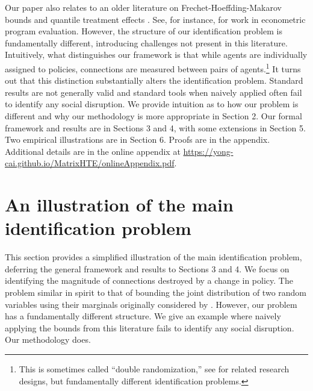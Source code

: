 \documentclass[12pt]{article}
\theoremstyle{definition}
\begin{document}
Our paper also relates to an older literature on Frechet-Hoeffding-Makarov bounds \citep{hoeffding1940masstabinvariante,frechet1951tableaux,makarov1982estimates} and quantile treatment effects \citep{doksum1974empirical,lehmann1975nonparametrics,whitt1976bivariate}. See, for instance, \cite{manski1997mixing,manski2003partial,heckman1997making,bitler2006mean,firpo2007efficient,fan2010sharp,tamer2010partial,abadie2018econometric,masten2018identification,masten2020inference,firpo2019partial,frandsen2021partial} for work in econometric program evaluation. However, the structure of our identification problem is fundamentally different, introducing challenges not present in this literature. Intuitively, what distinguishes our framework is that while agents are individually assigned to policies, connections are measured between pairs of agents.\footnote{This is sometimes called ``double randomization,'' see \cite{graham2011econometric,graham2014complementarity,bajari2021multiple,johari2022experimental} for related research designs, but fundamentally different identification problems.} It turns out that this distinction substantially alters the identification problem. Standard results are not generally valid and standard tools when naively applied often fail to identify any social disruption. We provide intuition as to how our problem is different and why our methodology is more appropriate in Section 2. Our formal framework and results are in Sections 3 and 4, with some extensions in Section 5. Two empirical illustrations are in Section 6. Proofs are in the appendix. Additional details are in the online appendix at \url{https://yong-cai.github.io/MatrixHTE/onlineAppendix.pdf}.    


\section{An illustration of the main identification problem}
This section provides a simplified illustration of the main identification problem, deferring the general framework and results to Sections 3 and 4. We focus on identifying the magnitude of connections destroyed by a change in policy. The problem similar in spirit to that of bounding the joint distribution of two random variables using their marginals originally considered by \cite{hoeffding1940masstabinvariante,frechet1951tableaux}. However, our problem has a fundamentally different structure. We give an example where naively applying the bounds from this literature fails to identify any social disruption. Our methodology does.   
\end{document}
